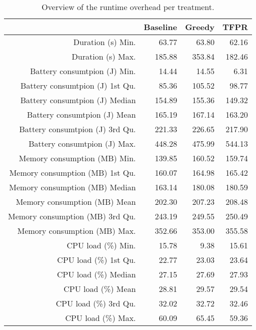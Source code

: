 \begin{table}[ht]
\centering
\begin{tabular}{rrrr}
  \hline
 & Baseline & Greedy & TFPR \\ 
  \hline
Duration (s) Min. & 63.77 & 63.80 & 62.16 \\ 
  Duration (s) Max. & 185.88 & 353.84 & 182.46 \\ 
  Battery consumtpion (J) Min. & 14.44 & 14.55 & 6.31 \\ 
  Battery consumtpion (J) 1st Qu. & 85.36 & 105.52 & 98.77 \\ 
  Battery consumtpion (J) Median & 154.89 & 155.36 & 149.32 \\ 
  Battery consumtpion (J) Mean & 165.19 & 167.14 & 163.20 \\ 
  Battery consumtpion (J) 3rd Qu. & 221.33 & 226.65 & 217.90 \\ 
  Battery consumtpion (J) Max. & 448.28 & 475.99 & 544.13 \\ 
  Memory consumption (MB) Min. & 139.85 & 160.52 & 159.74 \\ 
  Memory consumption (MB) 1st Qu. & 160.07 & 164.98 & 165.42 \\ 
  Memory consumption (MB) Median & 163.14 & 180.08 & 180.59 \\ 
  Memory consumption (MB) Mean & 202.30 & 207.23 & 208.48 \\ 
  Memory consumption (MB) 3rd Qu. & 243.19 & 249.55 & 250.49 \\ 
  Memory consumption (MB) Max. & 352.66 & 353.00 & 355.58 \\ 
  CPU load (\%) Min. & 15.78 & 9.38 & 15.61 \\ 
  CPU load (\%) 1st Qu. & 22.77 & 23.03 & 23.64 \\ 
  CPU load (\%) Median & 27.15 & 27.69 & 27.93 \\ 
  CPU load (\%) Mean & 28.81 & 29.57 & 29.54 \\ 
  CPU load (\%) 3rd Qu. & 32.02 & 32.72 & 32.46 \\ 
  CPU load (\%) Max. & 60.09 & 65.45 & 59.36 \\ 
   \hline
\end{tabular}
\caption{Overview of the runtime overhead per treatment.} 
\label{tab:results:rq1:summary:treatment}
\end{table}
